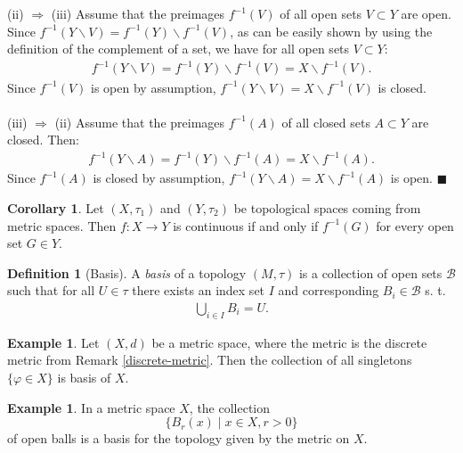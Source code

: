 \documentclass[12pt, a4paper]{article}
\numberwithin{equation}{section}
\theoremstyle{definition}
\theoremstyle{definition}
\newtheorem{defn}[thm]{Definition} %
\newtheorem{exmp}[thm]{Example} %
\newtheorem{corollary}[thm]{Corollary}
\begin{document}
	\\ 
	\\
	(ii) $\Rightarrow$ (iii) Assume that the preimages $f^{-1}(V)$ of all open sets $V\subset Y$ are open. Since $f^{-1}(Y\backslash V) = f^{-1}(Y)\backslash f^{-1}(V)$, as can be easily shown by using the definition of the complement of a set, we have for all open sets $V \subset Y$: 
	\begin{align}
		f^{-1}(Y\backslash V) = f^{-1}(Y)\backslash f^{-1}(V) = X\backslash f^{-1}(V). 
	\end{align}
	Since $f^{-1}(V)$ is open by assumption, $f^{-1}(Y\backslash V) = X\backslash f^{-1}(V)$ is closed. 
	\\ 
	\\
	(iii) $\Rightarrow$ (ii) Assume that the preimages $f^{-1}(A)$
	of all closed sets $A\subset Y$ are closed. Then: 
	\begin{align}
		f^{-1}(Y\backslash A) = f^{-1}(Y)\backslash f^{-1}(A) = X\backslash f^{-1}(A). 
	\end{align}
	Since $f^{-1}(A)$ is closed by assumption, $f^{-1}(Y\backslash A) = X\backslash f^{-1}(A)$ is open. \cite{preimage-of-closed-sets} \qquad\qquad\qquad\qquad\qquad\quad$\blacksquare$
	
	\begin{corollary}
		Let $(X, \tau_1)$ and $(Y, \tau_2)$ be topological spaces coming from metric spaces. Then $f: X\rightarrow Y$ is continuous if and only if $f^{-1}(G)$ for every open set $G\in Y$. 
	\end{corollary}
	
	\begin{defn}[Basis]
		A \textit{basis} of a topology $\left(M, \tau\right)$ is a collection of open sets $\mathcal B$ such that for all $U\in \tau$ there exists an index set $I$ and corresponding $B_i\in \mathcal B$ s. t. 
		\begin{align}
			\bigcup_{i\in I}B_i = U. 
		\end{align}
	\end{defn}

	\begin{exmp}\label{basis_discrete_metric}
		Let $(X, d)$ be a metric space, where the metric is the discrete metric from Remark \ref{discrete-metric}. Then the collection of all singletons $\{\varphi\in X\}$ is basis of $X$. 
	\end{exmp}
	
	\begin{exmp}\label{basis_metric_space}
		In a metric space $X$, the collection $$\{ B_{r}(x) \mid x\in X, r > 0 \}$$ of open balls is a basis for the topology given by the metric on $X$. 
	\end{exmp}
\end{document}
